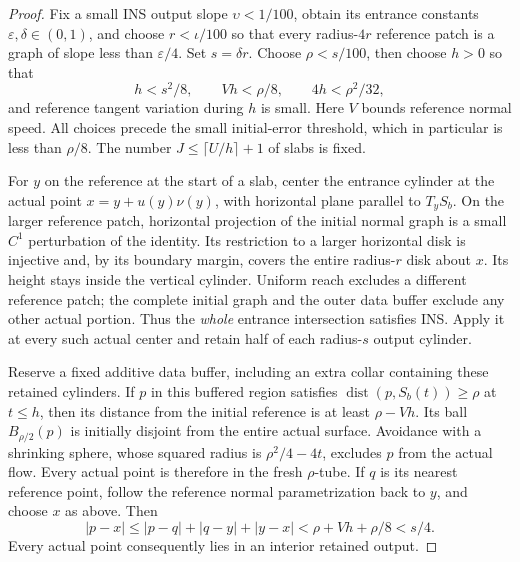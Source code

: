 \begin{proof}
Fix a small INS output slope $\upsilon<1/100$, obtain its entrance
constants $\varepsilon,\delta\in(0,1)$, and choose $r<\iota/100$ so that
every radius-$4r$ reference patch is a graph of slope less than
$\varepsilon/4$.  Set $s=\delta r$.  Choose $\rho<s/100$, then
choose $h>0$ so that
\begin{equation}\label{flow:patch-time}
 h<s^2/8,\qquad Vh<\rho/8,\qquad 4h<\rho^2/32,
\end{equation}
and reference tangent variation during $h$ is small.  Here $V$
bounds reference normal speed.  All choices precede the small
initial-error threshold, which in particular is less than $\rho/8$.
The number $J\le\lceil U/h\rceil+1$ of slabs is fixed.

For $y$ on the reference at the start of a slab, center the entrance
cylinder at the actual point $x=y+u(y)\nu(y)$, with horizontal plane
parallel to $T_yS_b$.  On the larger reference patch, horizontal
projection of the initial normal graph is a small $C^1$ perturbation
of the identity.  Its restriction to a larger horizontal disk is
injective and, by its boundary margin, covers the entire radius-$r$
disk about $x$.  Its height stays inside the vertical cylinder.
Uniform reach excludes a different reference patch; the complete
initial graph and the outer data buffer exclude any other actual
portion.  Thus the \emph{whole} entrance intersection satisfies INS.
Apply it at every such actual center and retain half of each
radius-$s$ output cylinder.

Reserve a fixed additive data buffer, including an extra collar
containing these retained cylinders.  If $p$ in this buffered region
satisfies $\operatorname{dist}(p,S_b(t))\ge\rho$ at $t\le h$,
then its distance from the initial reference is at least
$\rho-Vh$.  Its ball $B_{\rho/2}(p)$ is initially disjoint from
the entire actual surface.  Avoidance with a shrinking sphere,
whose squared radius is $\rho^2/4-4t$, excludes $p$ from the
actual flow.  Every actual point is therefore in the fresh
$\rho$-tube.  If $q$ is its nearest reference point, follow the
reference normal parametrization back to $y$, and choose $x$ as
above.  Then
\begin{equation}\label{flow:refined-membership}
 |p-x|\le |p-q|+|q-y|+|y-x|
          <\rho+Vh+\rho/8<s/4.
\end{equation}
Every actual point consequently lies in an interior retained output.


\end{proof}
